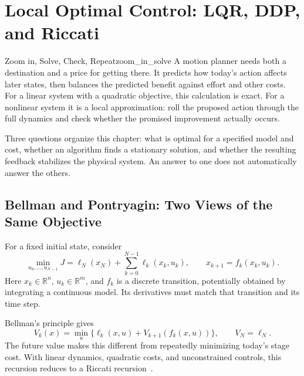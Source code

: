 \chapter{Local Optimal Control: LQR, DDP, and Riccati}
\label{ch:optimal-control}

\begin{laymansbox}{Zoom in, Solve, Check, Repeat}{zoom_in_solve}
A motion planner needs both a destination and a price for getting there. It
predicts how today's action affects later states, then balances the predicted
benefit against effort and other costs. For a linear system with a quadratic
objective, this calculation is exact. For a nonlinear system it is a local
approximation: roll the proposed action through the full dynamics and check
whether the promised improvement actually occurs.
\end{laymansbox}

Three questions organize this chapter: what is optimal for a specified model
and cost, whether an algorithm finds a stationary solution, and whether the
resulting feedback stabilizes the physical system. An answer to one does not
automatically answer the others.

\section{Bellman and Pontryagin: Two Views of the Same Objective}

For a fixed initial state, consider
\begin{equation}
\min_{u_0,\ldots,u_{N-1}}J=\ell_N(x_N)+\sum_{k=0}^{N-1}\ell_k(x_k,u_k),
\qquad x_{k+1}=f_k(x_k,u_k).
\label{eq:ch5:traj-opt}
\end{equation}
Here $x_k\in\mathbb R^n$, $u_k\in\mathbb R^m$, and $f_k$ is a discrete
transition, potentially obtained by integrating a continuous model. Its
derivatives must match that transition and its time step.

Bellman's principle gives
\begin{equation}
V_k(x)=\min_u\{\ell_k(x,u)+V_{k+1}(f_k(x,u))\},\qquad V_N=\ell_N.
\label{eq:ch5:bellman}
\end{equation}
The future value makes this different from repeatedly minimizing today's stage
cost. With linear dynamics, quadratic costs, and unconstrained controls, this
recursion reduces to a Riccati recursion~\cite{bellman1957}.

